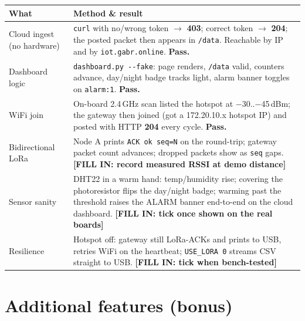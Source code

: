 \documentclass[11pt,a4paper]{article}
\newcommand{\fillin}[1]{{\color{okfg}\textbf{[FILL IN: #1]}}}
\begin{document}
\begin{longtable}{@{}p{4.4cm}p{10.4cm}@{}}
\toprule
\textbf{What} & \textbf{Method \& result}\\
\midrule\endhead
Cloud ingest (no hardware) & \texttt{curl} with no/wrong token $\rightarrow$ \textbf{403}; correct token $\rightarrow$ \textbf{204}; the posted packet then appears in \texttt{/data}. Reachable by IP and by \texttt{iot.gabr.online}. \textbf{Pass.}\\
Dashboard logic & \texttt{dashboard.py -{}-fake}: page renders, \texttt{/data} valid, counters advance, day/night badge tracks light, alarm banner toggles on \texttt{alarm:1}. \textbf{Pass.}\\
WiFi join & On-board 2.4\,GHz scan listed the hotspot at $-$30..$-$45\,dBm; the gateway then joined (got a 172.20.10.x hotspot IP) and posted with HTTP \textbf{204} every cycle. \textbf{Pass.}\\
Bidirectional LoRa & Node A prints \texttt{ACK ok seq=N} on the round-trip; gateway packet count advances; dropped packets show as \texttt{seq} gaps. \fillin{record measured RSSI at demo distance}\\
Sensor sanity & DHT22 in a warm hand: temp/humidity rise; covering the photoresistor flips the day/night badge; warming past the threshold raises the ALARM banner end-to-end on the cloud dashboard. \fillin{tick once shown on the real boards}\\
Resilience & Hotspot off: gateway still LoRa-ACKs and prints to USB, retries WiFi on the heartbeat; \texttt{USE\_LORA 0} streams CSV straight to USB. \fillin{tick when bench-tested}\\
\bottomrule
\end{longtable}

\section{Additional features (bonus)}
\end{document}
